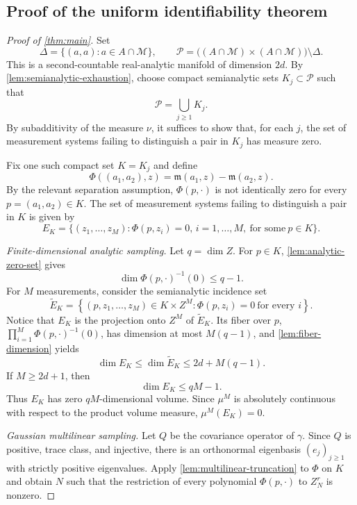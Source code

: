 \documentclass[11pt,oneside]{amsart}
\theoremstyle{plain}
\theoremstyle{definition}
\theoremstyle{remark}
\newcommand{\calM}{\mathcal{M}}
\begin{document}
\subsection{Proof of the uniform identifiability theorem}
\begin{proof}[Proof of \cref{thm:main}]
Set
\[
    \Delta=\{(a,a):a\in A\cap\calM\},
    \qquad
    \mathcal P
    =\bigl((A\cap\calM)\times(A\cap\calM)\bigr)\setminus\Delta.
\]
This is a second-countable real-analytic manifold of dimension $2d$. By \cref{lem:semianalytic-exhaustion}, choose compact semianalytic sets $K_j\subset\mathcal P$ such that $$\mathcal P=\bigcup_{j\geq1}K_j.$$ By subadditivity of the measure $\nu$, it suffices to show that, for each $j$, the set of measurement systems failing to distinguish a pair in $K_j$ has measure zero.

Fix one such compact set $K=K_j$ and define
\[
    \Phi((a_1,a_2),z)
    =\mathfrak m(a_1,z)-\mathfrak m(a_2,z).
\]
By the relevant separation assumption, $\Phi(p,\cdot)$ is not identically zero for every $p=(a_1,a_2)\in K$. The set of measurement systems failing to distinguish a pair in $K$ is given by
\begin{equation}\label{eq:Ek}
    E_K=\{(z_1,\dots,z_M): \Phi(p,z_i)=0,\,i=1,\dots,M,~\text{for some}~p\in K\}.
\end{equation}

\smallskip
\noindent\emph{Finite-dimensional analytic sampling.}
Let $q=\dim Z$. For $p\in K$, \cref{lem:analytic-zero-set} gives
\[
    \dim\Phi(p,\cdot)^{-1}(0)\leq q-1.
\]
For $M$ measurements, consider the semianalytic incidence set
\[
    \widetilde E_K
    =\left\{(p,z_1,\ldots,z_M)\in K\times Z^M:
      \Phi(p,z_i)=0\ \text{for every }i\right\}.
\]
Notice that $E_K$ is the projection onto $Z^M$ of $\widetilde E_K$. Its fiber over $p$, $\prod_{i=1}^M\Phi(p,\cdot)^{-1}(0)$, has dimension at most $M(q-1)$, and \cref{lem:fiber-dimension} yields
\[
    \dim E_K\leq \dim\widetilde E_K
    \leq 2d+M(q-1).
\]
If $M\geq2d+1$, then
\[
    \dim E_K\leq qM-1.
\]
Thus $E_K$ has zero $qM$-dimensional volume. Since $\mu^M$ is absolutely continuous with respect to the product volume measure, $\mu^M(E_K)=0$.

\smallskip
\noindent\emph{Gaussian multilinear sampling.}
Let $Q$ be the covariance operator of $\gamma$. Since $Q$ is positive, trace class, and injective, there is an orthonormal eigenbasis $(e_j)_{j\geq1}$ with strictly positive eigenvalues. Apply \cref{lem:multilinear-truncation} to $\Phi$ on $K$ and obtain $N$ such that the restriction of every polynomial $\Phi(p,\cdot)$ to $Z_N^r$ is nonzero.


\end{proof}
\end{document}
